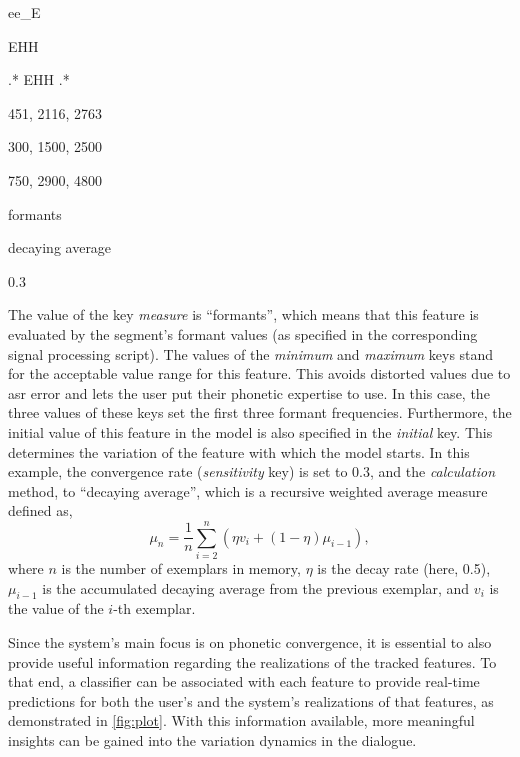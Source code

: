 \begin{description}[labelindent=1.5cm, labelwidth=\widthof{\quad \bfseries calculation}]
	\item[name]	ee\_E
	\item[phoneme] EHH
	\item[context] .* EHH .*
	\item[initial] 451, 2116, 2763
	\item[minimum] 300, 1500, 2500
	\item[maximum] 750, 2900, 4800
	\item[measure] formants
	\item[calculation] decaying average
	\item[sensitivity] 0.3
\end{description}
%
The value of the key \emph{measure} is \enquote{formants}, which means that this feature is evaluated by the segment's formant values (as specified in the corresponding signal processing script).
The values of the \emph{minimum} and \emph{maximum} keys stand for the acceptable value range for this feature.
This avoids distorted values due to \ac{asr} error and lets the user put their phonetic expertise to use.
In this case, the three values of these keys set the first three formant frequencies.
Furthermore, the initial value of this feature in the model is also specified in the \emph{initial} key.
This determines the variation of the feature with which the model starts.
In this example, the convergence rate (\emph{sensitivity} key) is set to 0.3, and the \emph{calculation} method, to \enquote{decaying average}, which is a recursive weighted average measure defined as,
%
\begin{equation} 
\label{eq:decaying_average} 
\mu_n = \frac{1}{n}\sum_{i = 2}^{n}(\eta v_i + (1 - \eta )\mu_{i-1}), 
\end{equation} 
%
where $n$ is the number of exemplars in memory, $\eta$ is the decay rate (here, 0.5), $\mu_{i-1}$ is the accumulated decaying average from the previous exemplar, and $v_i$ is the value of the $i$-th exemplar. 

Since the system's main focus is on phonetic convergence, it is essential to also provide useful information regarding the realizations of the tracked features.
To that end, a classifier can be associated with each feature to provide real-time predictions for both the user's and the system's realizations of that features, as demonstrated in \cref{fig:plot}.
With this information available, more meaningful insights can be gained into the variation dynamics in the dialogue.

